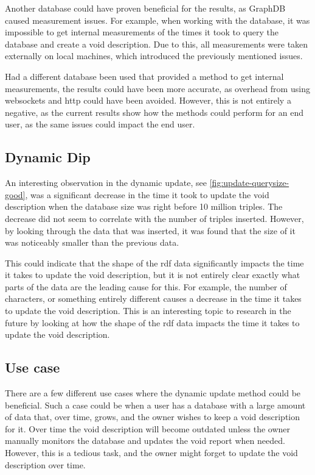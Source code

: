Another database could have proven beneficial for the results, as GraphDB caused measurement issues. For example, when working with the database, it was impossible to get internal measurements of the times it took to query the database and create a \gls{void} description. Due to this, all measurements were taken externally on local machines, which introduced the previously mentioned issues.

Had a different database been used that provided a method to get internal measurements, the results could have been more accurate, as overhead from using websockets and http could have been avoided. However, this is not entirely a negative, as the current results show how the methods could perform for an end user, as the same issues could impact the end user.

\subsection{Dynamic Dip}\label{subsec:dynamic-dip}
An interesting observation in the dynamic update, see \autoref{fig:update-querysize-good}, was a significant decrease in the time it took to update the \gls{void} description when the database size was right before 10 million triples. The decrease did not seem to correlate with the number of triples inserted. However, by looking through the data that was inserted, it was found that the size of it was noticeably smaller than the previous data.

This could indicate that the shape of the \gls{rdf} data significantly impacts the time it takes to update the \gls{void} description, but it is not entirely clear exactly what parts of the data are the leading cause for this. For example, the number of characters, or something entirely different causes a decrease in the time it takes to update the \gls{void} description. This is an interesting topic to research in the future by looking at how the shape of the \gls{rdf} data impacts the time it takes to update the \gls{void} description.

\subsection{Use case}\label{subsec:use-case}
There are a few different use cases where the dynamic update method could be beneficial. Such a case could be when a user has a database with a large amount of data that, over time, grows, and the owner wishes to keep a \gls{void} description for it. Over time the \gls{void} description will become outdated unless the owner manually monitors the database and updates the \gls{void} report when needed. However, this is a tedious task, and the owner might forget to update the \gls{void} description over time.


